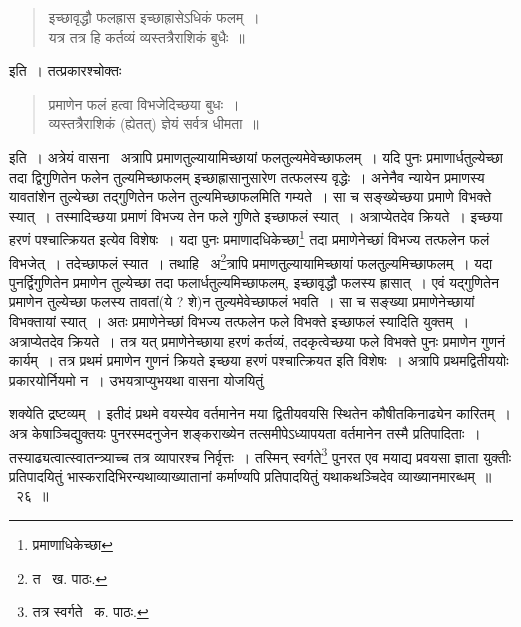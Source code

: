\documentclass[11pt, openany]{book}
\begin{document}
\begin{quote}
{\qt इच्छावृद्धौ फलह्रास इच्छाह्रासेऽधिकं फलम्~।\\		
यत्र तत्र हि कर्तव्यं व्यस्तत्रैराशिकं बुधैः~॥}
\end{quote}

\noindent इति~। तत्प्रकारश्चोक्तः\textendash 

\begin{quote}
{\qt प्रमाणेन फलं हत्वा विभजेदिच्छया बुधः~।\\
व्यस्तत्रैराशिकं (ह्येतत्) ज्ञेयं सर्वत्र धीमता~॥}
\end{quote}

\noindent इति~। अत्रेयं वासना \textendash\ अत्रापि प्रमाणतुल्यायामिच्छायां फलतुल्यमेवेच्छाफलम्~। यदि पुनः प्रमाणार्धतुल्येच्छा तदा द्विगुणितेन फलेन तुल्यमिच्छाफलम् इच्छाह्रासानुसारेण तत्फलस्य वृद्धेः~। अनेनैव न्यायेन प्रमाणस्य यावतांशेन तुल्येच्छा तद्गुणितेन फलेन तुल्यमिच्छाफलमिति गम्यते~। सा च सङ्ख्येच्छया प्रमाणे विभक्ते स्यात्~। तस्मादिच्छया प्रमाणं विभज्य तेन फले गुणिते इच्छाफलं स्यात्~। अत्राप्येतदेव क्रियते~। इच्छया हरणं पश्चात्क्रियत इत्येव विशेषः~। यदा पुनः प्रमाणादधिकेच्छा\renewcommand{\thefootnote}{१}\footnote{प्रमाणाधिकेच्छा} तदा प्रमाणेनेच्छां विभज्य तत्फलेन फलं विभजेत्~। तदेच्छाफलं स्यात~। तथाहि \textendash\ अ\renewcommand{\thefootnote}{२}\footnote{त \textendash\ ख. पाठः.}त्रापि प्रमाणतुल्यायामिच्छायां फलतुल्यमिच्छाफलम्~। यदा पुनर्द्विगुणितेन प्रमाणेन तुल्येच्छा तदा फलार्धतुल्यमिच्छाफलम्, इच्छावृद्धौ फलस्य ह्रासात्~। एवं यद्गुणितेन प्रमाणेन तुल्येच्छा फलस्य तावतां(ये ? शे)न तुल्यमेवेच्छाफलं भवति~। सा च सङ्ख्या प्रमाणेनेच्छायां विभक्तायां स्यात्~। अतः प्रमाणेनेच्छां विभज्य तत्फलेन फले विभक्ते इच्छाफलं स्यादिति युक्तम्~। अत्राप्येतदेव क्रियते~। तत्र यत् प्रमाणेनेच्छाया हरणं कर्तव्यं, तदकृत्वेच्छया फले विभक्ते पुनः प्रमाणेन गुणनं कार्यम्~। तत्र प्रथमं प्रमाणेन गुणनं क्रियते इच्छया हरणं पश्चात्क्रियत इति विशेषः~। अत्रापि प्रथमद्वितीययोः प्रकारयोर्नियमो न~। उभयत्राप्युभयथा वासना योजयितुं

\newpage

\noindent शक्येति द्रष्टव्यम्~। इतीदं प्रथमे वयस्येव वर्तमानेन मया द्वितीयवयसि स्थितेन कौषीतकिनाढ्येन कारितम्~। अत्र केषाञ्चिद्युक्तयः पुनरस्मदनुजेन शङ्कराख्येन तत्समीपेऽध्यापयता वर्तमानेन तस्मै प्रतिपादिताः~। तस्याढ्यत्वात्स्वातन्त्र्याच्च तत्र व्यापारश्च निर्वृत्तः~। तस्मिन्
स्वर्गते\renewcommand{\thefootnote}{१}\footnote{तत्र स्वर्गते \textendash\ क. पाठः.} पुनरत एव मयाद्य प्रवयसा ज्ञाता युक्तीः प्रतिपादयितुं भास्करादिभिरन्यथाव्याख्यातानां कर्माण्यपि प्रतिपादयितुं यथाकथञ्चिदेव व्याख्यानमारब्धम्~॥~२६~॥\\
\end{document}
